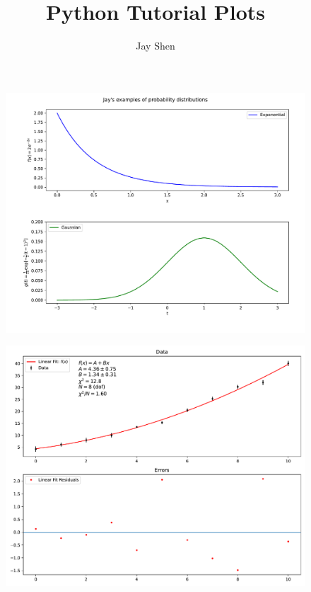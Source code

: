 \documentclass{article}
\title{Python Tutorial Plots}
\author{Jay Shen}
\begin{document}
\maketitle

\begin{figure}
\centering
\includegraphics[width=1\linewidth]{experiment1/example1/task5.pdf}
\end{figure}

\begin{figure}
\centering
\includegraphics[width=1\linewidth]{experiment1/example2/task5.pdf}
\end{figure}
\end{document}

